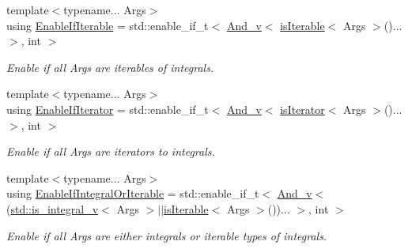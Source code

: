\begin{DoxyCompactItemize}
{\footnotesize template$<$typename... Args$>$ }\\using \hyperlink{namespacecnt_1_1help_af28e6c14e973fb60e8a41270dbcb249c}{Enable\+If\+Iterable} = std\+::enable\+\_\+if\+\_\+t$<$ \hyperlink{namespacecnt_1_1help_a502eecdcb745c74d4f7457265b764ef2}{And\+\_\+v}$<$ \hyperlink{namespacecnt_1_1help_aeb5c3fce1a6876c4cefecde18ba7daf0}{is\+Iterable}$<$ Args $>$()... $>$, int $>$
\begin{DoxyCompactList}\small\item\em Enable if all \textquotesingle{}Args\textquotesingle{} are iterables of integrals. \end{DoxyCompactList}\item 
{\footnotesize template$<$typename... Args$>$ }\\using \hyperlink{namespacecnt_1_1help_a104cf8940601cb2ad309c0993667d91f}{Enable\+If\+Iterator} = std\+::enable\+\_\+if\+\_\+t$<$ \hyperlink{namespacecnt_1_1help_a502eecdcb745c74d4f7457265b764ef2}{And\+\_\+v}$<$ \hyperlink{namespacecnt_1_1help_a8461005914a45b87910a6f36746eb4f4}{is\+Iterator}$<$ Args $>$()... $>$, int $>$
\begin{DoxyCompactList}\small\item\em Enable if all \textquotesingle{}Args\textquotesingle{} are iterators to integrals. \end{DoxyCompactList}\item 
{\footnotesize template$<$typename... Args$>$ }\\using \hyperlink{namespacecnt_1_1help_a6b660ad7dc1ea8aa67f0410733a0a3c9}{Enable\+If\+Integral\+Or\+Iterable} = std\+::enable\+\_\+if\+\_\+t$<$ \hyperlink{namespacecnt_1_1help_a502eecdcb745c74d4f7457265b764ef2}{And\+\_\+v}$<$(\hyperlink{namespacestd_a824c5eb1a7e8aafa382dc9af3329a9e8}{std\+::is\+\_\+integral\+\_\+v}$<$ Args $>$$\vert$$\vert$\hyperlink{namespacecnt_1_1help_aeb5c3fce1a6876c4cefecde18ba7daf0}{is\+Iterable}$<$ Args $>$())... $>$, int $>$
\begin{DoxyCompactList}\small\item\em Enable if all \textquotesingle{}Args\textquotesingle{} are either integrals or iterable types of integrals. \end{DoxyCompactList}\end{DoxyCompactItemize}

